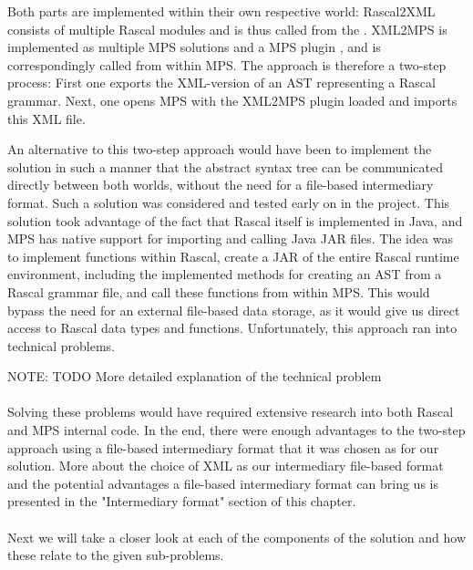 \documentclass[a4paper]{article}
\begin{document}
Both parts are implemented within their own respective world: Rascal2XML consists of multiple Rascal modules and is thus called from the  . XML2MPS is implemented as multiple MPS solutions and a MPS plugin , and is correspondingly called from within MPS. The approach is therefore a two-step process: First one exports the XML-version of an AST representing a Rascal grammar. Next, one opens MPS with the XML2MPS plugin loaded and imports this XML file.

 
An alternative to this two-step approach would have been to implement the solution in such a manner that the abstract syntax tree can be communicated directly between both worlds, without the need for a file-based intermediary format. Such a solution was considered and tested early on in the project. This solution took advantage of the fact that Rascal itself is implemented in Java, and MPS has native support for importing and calling Java JAR  files. The idea was to implement functions within Rascal, create a JAR of the entire Rascal runtime environment, including the implemented methods for creating an AST from a Rascal grammar file, and call these functions from within MPS. This would bypass the need for an external file-based data storage, as it would give us direct access to Rascal data types and functions. Unfortunately, this approach ran into technical problems.

NOTE: TODO More detailed explanation of the technical problem 
\\\\
Solving these problems would have required extensive research into both Rascal and MPS internal code.  In the end, there were enough advantages to the two-step approach using a file-based intermediary format that it was chosen as for our solution. More about the choice of XML as our intermediary file-based format and the potential advantages a file-based intermediary format can bring us is presented in the "Intermediary format" section of this chapter.
\\\\
Next we will take a closer look at each of the components of the solution and how these relate to the given sub-problems.
\end{document}
